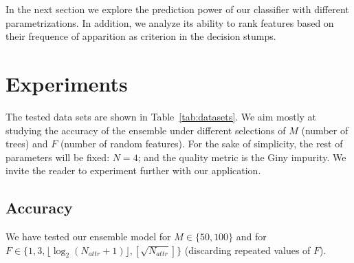 \documentclass[journal, a4paper]{IEEEtran}
\begin{document}
	In the next section we explore the prediction power of our classifier
	with different parametrizations. In addition, we analyze its ability
	to rank features based on their frequence of apparition as criterion
	in the decision stumps.

\section{Experiments}

\begin{table}[tbp]
\centering
\caption{Data sets used for testing our RF implementation}
\label{tab:datasets}
\end{table}

The tested data sets are shown in Table~\ref{tab:datasets}. We aim mostly at
studying the accuracy of the ensemble under different selections of $M$ (number
of trees) and $F$ (number of random features). For the sake of simplicity, the
rest of parameters will be fixed: $ N = 4 $; and the quality metric is the
Giny impurity. We invite the reader to experiment further with our application.

\subsection{Accuracy}

We have tested our ensemble model for $ M \in \{50, 100\} $ and for
$ F \in \{1, 3, \lfloor\log_2(N_{attr}+1)\rfloor, \left[\sqrt{N_{attr}}\right]\} $ (discarding
repeated values of $ F $).
\end{document}
